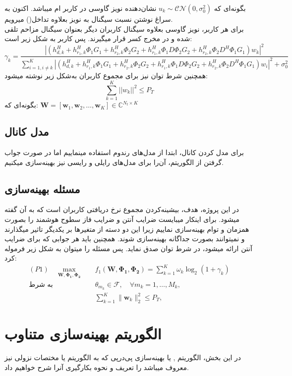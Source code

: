 بگونه‌ای که $u_k \sim \mathcal{CN}(0, \sigma_0^2)$ نشان‌دهنده نویز گاوسی در کاربر  ام میباشد.
\newpage
اکنون به سراغ نوشتن نسبت سیگنال به نویز بعلاوه تداخل() میرویم.\\
برای هر کاربر، نویز گاوسی بعلاوه سیگنال کاربران دیگر بعنوان سیگنال مزاحم تلقی شده و در مخرج کسر قرار میگیرند. پس  کاربر  به شکل زیر است:
\[
\gamma_k = \frac{{\left|\left(h_{d,k}^H + h_{r_1,k}^H \Phi_1 G_1 + h_{r_2,k}^H \Phi_2 G_2 + h_{r_1,k}^H \Phi_1 D \Phi_2 G_2 + h_{r_2,k}^H \Phi_2 D^H \Phi_1 G_1 \right)w_k\right|^2}}{{\sum_{i=1,i\neq k}^{K} \left|\left(h_{d,k}^H + h_{r_1,k}^H \Phi_1 G_1 + h_{r_2,k}^H \Phi_2 G_2 + h_{r_1,k}^H \Phi_1 D \Phi_2 G_2 + h_{r_2,k}^H \Phi_2 D^H \Phi_1 G_1 \right)w_i\right|^2 + \sigma^2_0}}
\]
همچنین شرط توان نیز برای مجموع کاربران به‌شکل زیر نوشته میشود:
\[
\sum_{k=1}^{K} ||w_k||^2 \leq P_T
\]
بگونه‌ای که:
$\mathbf{W} = [\mathbf{w}_1, \mathbf{w}_2, \ldots, \mathbf{w}_K] \in \mathbb{C}^{N_t \times K}$

\subsection{مدل کانال}
برای مدل کردن کانال، ابتدا از مدل‌های رندوم استفاده مینماییم اما در صورت جواب گرفتن از الگوریتم، آن‌را برای مدل‌های رایلی و رایسی نیز بهینه‌سازی میکنیم.

\subsection{مسئله بهینه‌سازی}
در این پروژه، هدف، بیشینه‌کردن مجموع نرخ دریافتی کاربران است که به آن  گفته میشود. برای اینکار میبایست ضرایب آنتن و ضرایب فاز سطوح هوشمند را بصورت همزمان و توام بهینه‌سازی نماییم زیرا این دو دسته از متغیرها بر یکدیگر تاثیر میگذارند و نمیتوانند بصورت جداگانه بهینه‌سازی شوند. همچنین باید هر جوابی که برای ضرایب آنتن ارائه میشود، در شرط توان صدق نماید. پس مسئله را میتوان به شکل زیر فرموله کرد:
\begin{align*}
	(P1) \quad \max_{\mathbf{W}, \boldsymbol{\Phi_1}, \boldsymbol{\Phi_2}} \quad & f_1(\mathbf{W}, \boldsymbol{\Phi_1}, \boldsymbol{\Phi_2}) = \sum_{k=1}^{K} \omega_k \log_2(1 + \gamma_k) \\
	\text{به شرط} \quad & \theta_{m_k} \in \mathcal{F}, \quad \forall m_k = 1, \ldots, M_k, \tag{4-2} \\
	& \sum_{k=1}^{K} \| \mathbf{w}_k \|_2^2 \leq P_T,
\end{align*}

\section{الگوریتم بهینه‌سازی متناوب}
در این بخش، الگوریتم  
\cite{13}, \cite{14}
یا بهینه‌سازی پی‌در‌پی که به الگوریتم  یا مختصات نزولی نیز معروف میباشد را تعریف و نحوه بکارگیری آنرا شرح خواهیم داد.
